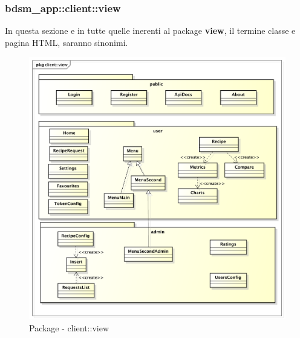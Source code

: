 %


\subsubsection{bdsm\_app::client::view} %
\label{ssub:bdsm_app_client_view}
In questa sezione e in tutte quelle inerenti al package \textbf{view}, il termine classe e pagina HTML, saranno sinonimi.
\begin{figure}[htbp]
	\centering
	\centerline{\includegraphics[scale=0.5]{./images/client_view.pdf}}
	\caption{Package - client::view}
\end{figure}

